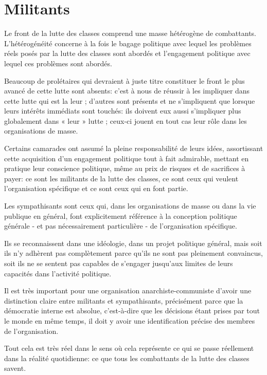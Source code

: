 \section{Militants}

Le front de la lutte des classes comprend une masse hétérogène de combattants. L'hétérogénéité concerne à la fois le bagage politique avec lequel les problèmes réels posés par la lutte des classes sont abordés et l'engagement politique avec lequel ces problèmes sont abordés.

Beaucoup de prolétaires qui devraient à juste titre constituer le front le plus avancé de cette lutte sont absents: c'est à nous de réussir à les impliquer dans cette lutte qui est la leur ; d'autres sont présents et ne s'impliquent que lorsque leurs intérêts immédiats sont touchés: ils doivent eux aussi s'impliquer plus globalement dans « leur » lutte ; ceux-ci jouent en tout cas leur rôle dans les organisations de masse.

Certains camarades ont assumé la pleine responsabilité de leurs idées, assortissant cette acquisition d'un engagement politique tout à fait admirable, mettant en pratique leur conscience politique, même au prix de risques et de sacrifices à payer: ce sont les militants de la lutte des classes, ce sont ceux qui veulent l'organisation spécifique et ce sont ceux qui en font partie.

Les sympathisants sont ceux qui, dans les organisations de masse ou dans la vie publique en général, font explicitement référence à la conception politique générale - et pas nécessairement particulière - de l'organisation spécifique.

Ils se reconnaissent dans une idéologie, dans un projet politique général, mais soit ils n'y adhèrent pas complètement parce qu'ils ne sont pas pleinement convaincus, soit ils ne se sentent pas capables de s'engager jusqu'aux limites de leurs capacités dans l'activité politique.

Il est très important pour une organisation anarchiste-communiste d'avoir une distinction claire entre militants et sympathisants, précisément parce que la démocratie interne est absolue, c'est-à-dire que les décisions étant prises par tout le monde en même temps, il doit y avoir une identification précise des membres de l'organisation.

Tout cela est très réel dans le sens où cela représente ce qui se passe réellement dans la réalité quotidienne: ce que tous les combattants de la lutte des classes savent.

